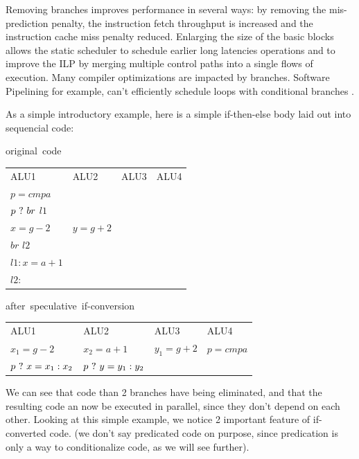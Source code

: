 Removing branches improves performance in several ways: by removing the mis-prediction penalty, the instruction fetch throughput is increased and the instruction cache miss penalty reduced. Enlarging the size of the basic blocks allows the static scheduler to schedule earlier long latencies operations and to improve the ILP by merging multiple control paths into a single flows of execution. Many compiler optimizations are impacted by branches. Software Pipelining for example, can't efficiently schedule loops with conditional branches \cite{Warter:1992:EMS:144953.145796}.

As a simple introductory example, here is a simple if-then-else body laid out into sequencial code:

\begin{table}[ht]
\begin{minipage}[t]{.5\linewidth}
\centering
 \mbox{original code} \\
   \begin{tabular}{| l | l | l | l | }
    \hline
ALU1 & ALU2 & ALU3 & ALU4 \\
$ p = cmp a $ & & & \\
$ p ~?~ br$ $l1$ & & & \\
$ x = g - 2 $ & $ y = g + 2 $ & & \\
$ br$ $ l2 $ & & & \\
$ l1: x = a + 1 $ & & & \\
$ l2: $ & & & \\
    \hline
    \end{tabular}
\end{minipage}
\begin{minipage}[t]{.5\linewidth}
\centering
\mbox{after speculative if-conversion} \\
    \begin{tabular}{| l | l | l | l | }
    \hline
ALU1 & ALU2 & ALU3 & ALU4 \\
$ x_1 = g - 2 $ & $ x_2 = a + 1 $ & $y_1 = g + 2 $ & $ p = cmp a $ \\
$ p ~?~ x = x_1 : x_2 $ & $ p ~?~ y = y_1 : y_2 $ & & \\
    \hline
    \end{tabular}
\end{minipage}
\end{table}

We can see that code than 2 branches have being eliminated, and that the resulting code an now be executed in parallel, since they don't depend on each other. Looking at this simple example, we notice 2 important feature of if-converted code. (we don't say predicated code on purpose, since predication is only a way to conditionalize code, as we will see further).

